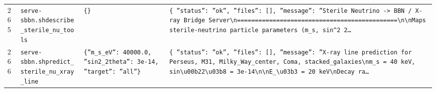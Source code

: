 \documentclass[11pt,a4paper]{article}
\begin{document}
\begin{longtable}{@{}p{}p{}p{}p{}@{}}
265 & \texttt{serve-sbbn.sh}\newline\texttt{describe\_\allowbreak{}sterile\_\allowbreak{}nu\_\allowbreak{}tools} & \texttt{\{\}\allowbreak{}} & \texttt{\{   ''status'':\allowbreak{} ''ok'',\allowbreak{}   ''files'':\allowbreak{} []\allowbreak{},\allowbreak{}   ''message'':\allowbreak{} ''Sterile Neutrino -\textgreater{}\allowbreak{} BBN /\allowbreak{} X-ray Bridge Server\textbackslash{}\allowbreak{}n=\allowbreak{}=\allowbreak{}=\allowbreak{}=\allowbreak{}=\allowbreak{}=\allowbreak{}=\allowbreak{}=\allowbreak{}=\allowbreak{}=\allowbreak{}=\allowbreak{}=\allowbreak{}=\allowbreak{}=\allowbreak{}=\allowbreak{}=\allowbreak{}=\allowbreak{}=\allowbreak{}=\allowbreak{}=\allowbreak{}=\allowbreak{}=\allowbreak{}=\allowbreak{}=\allowbreak{}=\allowbreak{}=\allowbreak{}=\allowbreak{}=\allowbreak{}=\allowbreak{}=\allowbreak{}=\allowbreak{}=\allowbreak{}=\allowbreak{}=\allowbreak{}=\allowbreak{}=\allowbreak{}=\allowbreak{}=\allowbreak{}=\allowbreak{}=\allowbreak{}=\allowbreak{}=\allowbreak{}=\allowbreak{}=\allowbreak{}=\allowbreak{}\textbackslash{}\allowbreak{}n\textbackslash{}\allowbreak{}nMaps sterile-neutrino particle parameters (m\_\allowbreak{}s,\allowbreak{} sin\textasciicircum{}\allowbreak{}2 2\ldots{}\allowbreak{}} \\
266 & \texttt{serve-sbbn.sh}\newline\texttt{predict\_\allowbreak{}sterile\_\allowbreak{}nu\_\allowbreak{}xray\_\allowbreak{}line} & \texttt{\{''m\_\allowbreak{}s\_\allowbreak{}eV'':\allowbreak{} 40000.0,\allowbreak{} ''sin2\_\allowbreak{}2theta'':\allowbreak{} 3e-14,\allowbreak{} ''target'':\allowbreak{} ''all''\}\allowbreak{}} & \texttt{\{   ''status'':\allowbreak{} ''ok'',\allowbreak{}   ''files'':\allowbreak{} []\allowbreak{},\allowbreak{}   ''message'':\allowbreak{} ''X-ray line prediction for Perseus,\allowbreak{} M31,\allowbreak{} Milky\_\allowbreak{}Way\_\allowbreak{}center,\allowbreak{} Coma,\allowbreak{} stacked\_\allowbreak{}galaxies\textbackslash{}\allowbreak{}nm\_\allowbreak{}s =\allowbreak{} 40 keV,\allowbreak{} sin\textbackslash{}\allowbreak{}u00b22\textbackslash{}\allowbreak{}u03b8 =\allowbreak{} 3e-14\textbackslash{}\allowbreak{}n\textbackslash{}\allowbreak{}nE\_\allowbreak{}\textbackslash{}\allowbreak{}u03b3 =\allowbreak{} 20 keV\textbackslash{}\allowbreak{}nDecay ra\ldots{}\allowbreak{}} \\

\end{longtable}
\end{document}

